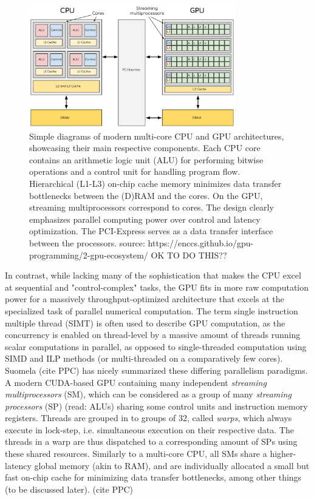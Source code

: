 \documentclass[english,12pt,a4paper,pdftex,sci,utf8]{aaltothesis}
\begin{document}
\begin{figure}[h]
    \centering
    \includegraphics[width=0.8\textwidth]{CPUAndGPU.png}
    \caption{Simple diagrams of modern multi-core CPU and GPU architectures, showcasing their main respective components. Each CPU core contains an arithmetic logic unit (ALU) for performing bitwise operations and a control unit for handling program flow. Hierarchical (L1-L3) on-chip cache memory minimizes data transfer bottlenecks between the (D)RAM and the cores. On the GPU, streaming multiprocessors correspond to cores. The design clearly emphasizes parallel computing power over control and latency optimization. The PCI-Express serves as a data transfer interface between the processors. source: https://enccs.github.io/gpu-programming/2-gpu-ecosystem/ OK TO DO THIS??}
    \label{fig:CPUandGPU}
\end{figure}

In contrast, while lacking many of the sophistication that makes the CPU excel at sequential and "control-complex" tasks, the GPU fits in more raw computation power for a massively throughput-optimized architecture that excels at the specialized task of parallel numerical computation. The term single instruction multiple thread (SIMT) is often used to describe GPU computation, as the concurrency is enabled on thread-level by a massive amount of threads running scalar computations in parallel, as opposed to single-threaded computation using SIMD and ILP methods (or multi-threaded on a comparatively few cores). Suomela (cite PPC) has nicely summarized these differing parallelism paradigms. A modern CUDA-based GPU containing many independent \emph{streaming multiprocessors} (SM), which can be considered as a group of many \emph{streaming processors} (SP) (read: ALUs) sharing some control units and instruction memory registers. Threads are grouped in to groups of 32, called \emph{warps}, which always execute in lock-step, i.e. simultaneous execution on their respective data. The threads in a warp are thus dispatched to a corresponding amount of SPs using these shared resources. Similarly to a multi-core CPU, all SMs share a higher-latency global memory (akin to RAM), and are individually allocated a small but fast on-chip cache for minimizing data transfer bottlenecks, among other things (to be discussed later). \cite{sanders2010cuda} \cite{kirk2016programming} (cite PPC)
\end{document}
